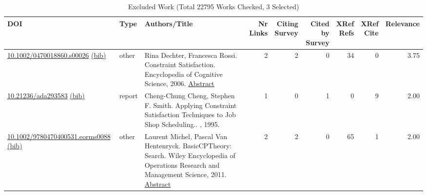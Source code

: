 {\scriptsize
\begin{longtable}{p{5cm}lp{11cm}rrrrrr}
\caption{Excluded Work (Total 22795 Works Checked, 3 Selected)}\\ \toprule
DOI & Type & Authors/Title & \shortstack{Nr\\Links} & \shortstack{Citing\\Survey} & \shortstack{Cited by\\Survey} & \shortstack{XRef\\Refs} & \shortstack{XRef\\Cite} & Relevance\\ \midrule\endhead
\bottomrule
\endfoot
\href{http://dx.doi.org/10.1002/0470018860.s00026}{10.1002/0470018860.s00026} \href{https://www.doi2bib.org/bib/10.1002/0470018860.s00026}{(bib)} & other & Rina Dechter, Francesca Rossi. Constraint Satisfaction. Encyclopedia of Cognitive Science, 2006. \hyperref[mw:mw15641]{Abstract} & 2 & 2 & 0 & 34 & 0 &  3.75\\
\href{http://dx.doi.org/10.21236/ada293583}{10.21236/ada293583} \href{https://www.doi2bib.org/bib/10.21236/ada293583}{(bib)} & report & Cheng-Chung Cheng, Stephen F. Smith. Applying Constraint Satisfaction Techniques to Job Shop Scheduling.. , 1995. & 1 & 0 & 1 & 0 & 9 &  2.00\\
\href{http://dx.doi.org/10.1002/9780470400531.eorms0088}{10.1002/9780470400531.eorms0088} \href{https://www.doi2bib.org/bib/10.1002/9780470400531.eorms0088}{(bib)} & other & Laurent Michel, Pascal Van Hentenryck. BasicCPTheory: Search. Wiley Encyclopedia of Operations Research and Management Science, 2011. \hyperref[mw:mw19351]{Abstract} & 2 & 2 & 0 & 65 & 1 &  2.00\\
\end{longtable}
}

